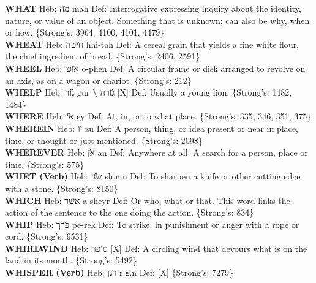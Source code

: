 {\textbf{WHAT} Heb: {\large\H מה} mah Def: Interrogative expressing inquiry about the identity, nature, or value of an object. Something that is unknown; can also be why, when or how. \{Strong's: 3964, 4100, 4101, 4479\}\hfill{}\\

\textbf{WHEAT} Heb: {\large\H חיטה} hhi-tah Def: A cereal grain that yields a fine white flour, the chief ingredient of bread. \{Strong's: 2406, 2591\}\hfill{}\\

\textbf{WHEEL} Heb: {\large\H אופן} o-phen Def: A circular frame or disk arranged to revolve on an axis, as on a wagon or chariot. \{Strong's: 212\}\hfill{}\\

\textbf{WHELP} Heb: {\large\H גור} gur \textbf{\textbackslash{}} {\large\H גורה} {[}X{]} Def: Usually a young lion. \{Strong's: 1482, 1484\}\hfill{}\\

\textbf{WHERE} Heb: {\large\H אי} ey Def: At, in, or to what place. \{Strong's: 335, 346, 351, 375\}\hfill{}\\

\textbf{WHEREIN} Heb: {\large\H זו} zu Def: A person, thing, or idea present or near in place, time, or thought or just mentioned. \{Strong's: 2098\}\hfill{}\\

\textbf{WHEREVER} Heb: {\large\H אן} an Def: Anywhere at all. A search for a person, place or time. \{Strong's: 575\}\hfill{}\\

\textbf{WHET (Verb)} Heb: {\large\H שנן} sh.n.n Def: To sharpen a knife or other cutting edge with a stone. \{Strong's: 8150\}\hfill{}\\

\textbf{WHICH} Heb: {\large\H אשר} a-sheyr Def: Or who, what or that. This word links the action of the sentence to the one doing the action. \{Strong's: 834\}\hfill{}\\

\textbf{WHIP} Heb: {\large\H פרך} pe-rek Def: To strike, in punishment or anger with a rope or cord. \{Strong's: 6531\}\hfill{}\\

\textbf{WHIRLWIND} Heb: {\large\H סופה} {[}X{]} Def: A circling wind that devours what is on the land in its mouth. \{Strong's: 5492\}\hfill{}\\

\textbf{WHISPER (Verb)} Heb: {\large\H רגן} r.g.n Def: {[}X{]} \{Strong's: 7279\}\hfill{}\\

}
